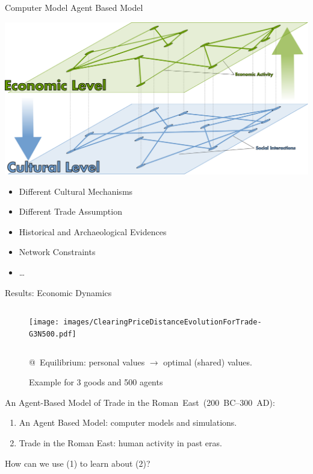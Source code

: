\documentclass[10pt, notes=show]{beamer}
\begin{document}
\begin{frame}{Computer Model}
    \vfill
    Agent Based Model
    \begin{center}
	\includegraphics[width=.5\textwidth]{images/cooev.png}	
    \end{center}
    \vfill
	\begin{itemize}
	\item Different Cultural Mechanisms
    \vfill
	\item Different Trade Assumption
    \vfill
	\item Historical and Archaeological Evidences 
    \vfill
	\item Network Constraints
    \vfill
	\item \dots
    \vfill
	\end{itemize}
\end{frame}
	


\begin{frame}{Results: Economic Dynamics}
	\begin{figure}
	    \caption{Example for 3 goods and 500 agents}
	    \begin{columns}
		\texttt{[image: images/ClearingPriceDistanceEvolutionForTrade-G3N500.pdf]}\\
	    \end{columns}
		@~Equilibrium: personal values  $\rightarrow$ optimal (shared) values.
	\end{figure}
	
\end{frame}

\begin{frame}{}
    An Agent-Based Model of Trade in the Roman~East~(200~BC--300~AD):
    \begin{center}
        \parbox{.6\textwidth}{
            \begin{enumerate}
                \item An Agent Based Model: computer models and simulations.
                \item Trade in the Roman East: human activity in past eras. 
            \end{enumerate}
        }
    \end{center}
    How can we use (\textcolor{tracblue}{1}) to learn about (\textcolor{tracblue}{2})?
    \vfill

\end{frame}
\end{document}
